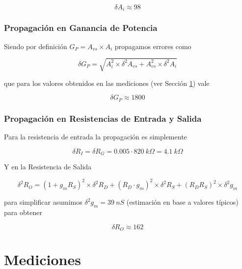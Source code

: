 \documentclass[a4paper, 10pt, spanish]{article}
\begin{document}
\begin{equation}
	\delta A_i \approx 98 \nonumber
	\end{equation}




\subsubsection{Propagación en Ganancia de Potencia}

Siendo por definición $G_P = A_{vs}\times A_{i}$ propagamos errores como

\begin{equation}
	\delta G_P = \sqrt{A_i^2 \times \delta^2 A_{vs} + A_{vs}^2\times \delta^2A_i} \nonumber
	\end{equation}

que para los valores obtenidos en las mediciones (ver Sección \ref{sec:mediciones}) vale

\begin{equation}
	\delta G_P \approx 1800 \nonumber
	\end{equation}


\subsubsection{Propagación en Resistencias de Entrada y Salida}

Para la resistencia de entrada la propagación es simplemente

\begin{equation}
	\delta R_I = \delta R_G = 0.005\cdot 820\ k\Omega = 4.1\ k\Omega \nonumber
	\end{equation}

Y en la Resistencia de Salida

\begin{equation}
	\delta^2 R_O = (1+g_mR_S)^2 \times \delta^2 R_D + (R_D\cdot g_m)^2 \times \delta^2 R_S + (R_DR_S)^2 \times \delta^2 g_m \nonumber
	\end{equation}

para simplificar asumimos $\delta^2 g_m = 39\ nS$ (estimación en base a valores típicos) para obtener

\begin{equation}
	\delta R_O \approx 162 \nonumber
\end{equation}


\newpage

\section{Mediciones}\label{sec:mediciones}
\end{document}
